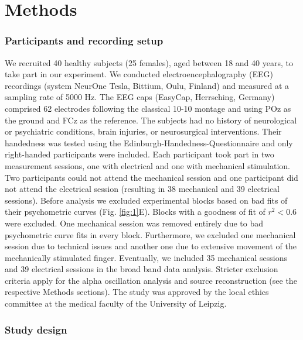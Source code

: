 \documentclass[11pt,a4paper,onecolumn]{article}
\begin{document}
\section*{Methods}

\subsubsection*{Participants and recording setup}
\vspace{-7pt}

We recruited 40 healthy subjects (25 females), aged between 18 and 40 years, to take part in our experiment. We conducted electroencephalography (EEG) recordings (system NeurOne Tesla, Bittium, Oulu, Finland) and measured at a sampling rate of 5000 Hz. The EEG caps (EasyCap, Herrsching, Germany) comprised 62 electrodes following the classical 10-10 montage and using POz as the ground and FCz as the reference. The subjects had no history of neurological or psychiatric conditions, brain injuries, or neurosurgical interventions. Their handedness was tested using the Edinburgh-Handedness-Questionnaire  \cite{oldfieldEdinburghHandednessInventory1971} and only right-handed participants were included. Each participant took part in two measurement sessions, one with electrical and one with mechanical stimulation. Two participants could not attend the mechanical session and one participant did not attend the electrical session (resulting in 38 mechanical and 39 electrical sessions). Before analysis we excluded experimental blocks based on bad fits of their psychometric curves (Fig. \ref{fig:1}E). Blocks with a goodness of fit of $r^2<0.6$ were excluded. One mechanical session was removed entirely due to bad psychometric curve fits in every block. Furthermore, we excluded one mechanical session due to technical issues and another one due to extensive movement of the mechanically stimulated finger. Eventually, we included 35 mechanical sessions and 39 electrical sessions in the broad band data analysis. Stricter exclusion criteria apply for the alpha oscillation analysis and source reconstruction (see the respective Methods sections). The study was approved by the local ethics committee at the medical faculty of the University of Leipzig.

\subsubsection*{Study design}
\vspace{-7pt}
\end{document}
